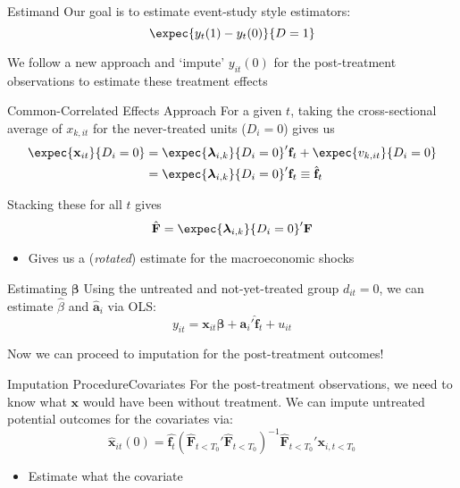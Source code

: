 \documentclass[aspectratio=169,t,11pt,table]{beamer}
\def\*#1{\mathbf{#1}}
\def\+#1{\boldsymbol{#1}}
\begin{document}
\begin{frame}{Estimand}
  Our goal is to estimate event-study style estimators:
  $$
    \expec{y_{t}(1) - y_{t}(0)}{D = 1}
  $$

  We follow a new approach and `impute' $y_{it}(0)$ for the post-treatment observations to estimate these treatment effects \citep{borusyak2021revisiting,brown2022generalized}
\end{frame}

\begin{frame}{Common-Correlated Effects Approach}
  For a given $t$, taking the cross-sectional average of $x_{k,it}$ for the never-treated units ($D_i = 0$) gives us 
  \begin{align*}
    \expec{\*x_{it}}{D_i = 0} &= \expec{\+\lambda_{i,k}}{D_i = 0}' \* f_t + \expec{v_{k,it}}{D_i = 0} \\
    &= \expec{\+\lambda_{i,k}}{D_i = 0}' \* f_t \equiv \hat{\* f}_t
  \end{align*}

  Stacking these for all $t$ gives 
  $$ 
    \hat{\* F} = \expec{\+\lambda_{i,k}}{D_i = 0}' \*F
  $$

  \begin{itemize}
    \item Gives us a (\emph{rotated}) estimate for the macroeconomic shocks
  \end{itemize}
\end{frame}

\begin{frame}{Estimating $\*\beta$}
  Using the untreated and not-yet-treated group $d_{it} = 0$, we can estimate $\hat{\beta}$ and $\hat{\*a}_i$ via OLS:
  $$
    y_{it} = \*x_{it} \*\beta + \*a_i' \hat{\* f}_t + u_{it}
  $$
  
  \bigskip
  Now we can proceed to imputation for the post-treatment outcomes!
\end{frame}

\begin{frame}{Imputation Procedure}{Covariates}
  For the post-treatment observations, we need to know what $\*x$ would have been without treatment. We can impute untreated potential outcomes for the covariates via:
  $$
    \hat{\*x}_{it}(0) = \hat{\*f_t} (\hat{\*F}_{t<T_0}'\hat{\*F}_{t<T_0})^{-1} \hat{\*F}_{t<T_0}' \*x_{i, t<T_0}
  $$

  \begin{itemize}
    \item Estimate what the covariate 
  \end{itemize}
\end{frame}
\end{document}
